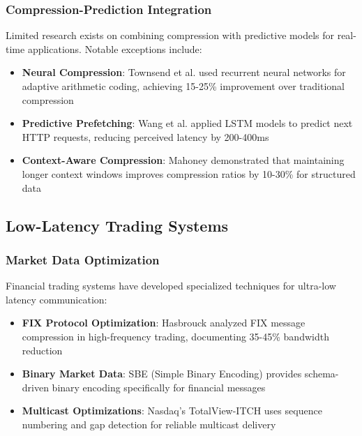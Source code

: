 \documentclass[12pt,a4paper]{article}
\begin{document}
\subsubsection{Compression-Prediction Integration}

Limited research exists on combining compression with predictive models for real-time applications. Notable exceptions include:

\begin{itemize}
    \item \textbf{Neural Compression}: Townsend et al. \cite{townsend2019} used recurrent neural networks for adaptive arithmetic coding, achieving 15-25\% improvement over traditional compression
    \item \textbf{Predictive Prefetching}: Wang et al. \cite{wang2020} applied LSTM models to predict next HTTP requests, reducing perceived latency by 200-400ms
    \item \textbf{Context-Aware Compression}: Mahoney \cite{mahoney2005} demonstrated that maintaining longer context windows improves compression ratios by 10-30\% for structured data
\end{itemize}

\subsection{Low-Latency Trading Systems}

\subsubsection{Market Data Optimization}

Financial trading systems have developed specialized techniques for ultra-low latency communication:

\begin{itemize}
    \item \textbf{FIX Protocol Optimization}: Hasbrouck \cite{hasbrouck2018} analyzed FIX message compression in high-frequency trading, documenting 35-45\% bandwidth reduction
    \item \textbf{Binary Market Data}: SBE (Simple Binary Encoding) \cite{sbe-spec} provides schema-driven binary encoding specifically for financial messages
    \item \textbf{Multicast Optimizations}: Nasdaq's TotalView-ITCH \cite{nasdaq-itch} uses sequence numbering and gap detection for reliable multicast delivery
\end{itemize}
\end{document}
